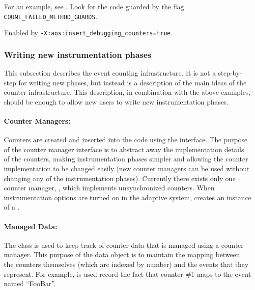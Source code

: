 \begin{enumerate}
For an example, see 
.  
Look
for the code guarded by the flag {\tt COUNT\_FAILED\_METHOD\_GUARDS}.
 
Enabled by {\tt -X:aos:insert\_debugging\_counters=true}.

\end{enumerate}

\subsubsection{Writing new instrumentation phases}
\label{adding_phases}
This subsection describes the event counting infrastructure.  It is
not a step-by-step for writing new phases, but instead is a
description of the main ideas of the counter infrastructure.
This description, in combination with the above examples, should be
enough to allow new users to write new instrumentation phases.

\paragraph{Counter Managers:}  Counters are created and inserted into
the code using the 
interface.
The purpose of the counter manager interface is to abstract away the
implementation details of the counters, making instrumentation
phases simpler and allowing the counter implementation to be changed
easily (new counter managers can be used without changing any of the
instrumentation phases).  Currently there exists only one counter
manager, 
, which implements unsynchronized
counters.
When instrumentation options
are turned on in the adaptive system, 
creates an instance of a .

\paragraph{Managed Data:} The class 
is used to
keep track of counter data that is managed using a counter
manager. This purpose of the data object is to maintain the mapping
between the counters themselves (which are indexed by number) and the
events that they represent.  For example, 
is used record the fact that counter \#1
maps to the event named ``FooBar''.  

